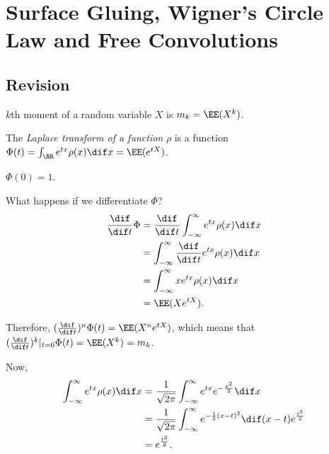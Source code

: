 \documentclass[11pt]{scrartcl}
\begin{document}
  \section{Surface Gluing, Wigner's Circle Law and Free Convolutions }
  
  \subsection{Revision}

  \begin{definition}
    $k$th moment of a random variable $X$ is $m_{k} = \EE(X^{k})$.
  \end{definition}

  \begin{definition}
    The \textit{Laplace transform of a function} $\rho$ is a function
    $\Phi(t) = \int_{\RR}e^{tx}\rho(x)\dif x = \EE(e^{tX})$.
  \end{definition}

  \begin{note*}
    $\Phi(0) = 1$.
  \end{note*}

  What happens if we differentiate $\Phi$?
  \begin{align}
    \frac{\dif }{\dif t}\Phi &= \frac{\dif }{\dif t}\int_{-\infty}^{\infty}e^{tx}\rho(x) \dif x\\
                             &= \int_{-\infty}^{\infty} \frac{\dif }{\dif t}e^{tx}\rho(x)\dif x\\
                             &= \int_{-\infty}^{\infty}x e^{tx}\rho(x) \dif x\\
                             &= \EE(Xe^{tX}).
  \end{align}  


  Therefore, $(\frac{\dif }{\dif t})^{n}\Phi(t) = \EE(X^{n}e^{tX})$,
  which means that
  $(\frac{\dif }{\dif t})^{k}|_{t=0}\Phi(t) = \EE(X^{k}) = m_{k}$.

  Now,
  \begin{align}
    \int_{-\infty}^{\infty}e^{tx}\rho(x) \dif x &= \frac{1}{\sqrt{2\pi }}\int_{-\infty}^{\infty}e^{tx}e^{- \frac{x^{2}}{2}}\dif x\\
                                                &= \frac{1}{\sqrt{2\pi}}\int_{-\infty}^{\infty} e^{-\frac{1}{2}(x-t)^{2}}\dif (x-t) \* e^{\frac{t^{2}}{2}}\\
                                                &= e^{\frac{t^{2}}{2}}.
  \end{align}
\end{document}
